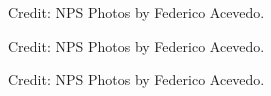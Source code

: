 \documentclass[10pt]{article}
\begin{document}
\begin{figure}[p]
 	\centering
 	\caption*{Credit: NPS Photos by Federico Acevedo.}
\end{figure}
\begin{figure}[h]
 	\centering
 	\caption*{Credit: NPS Photos by Federico Acevedo.}
\end{figure}
\begin{figure}[h]
 	\centering
 	\caption*{Credit: NPS Photos by Federico Acevedo.}
\end{figure}
\end{document}
